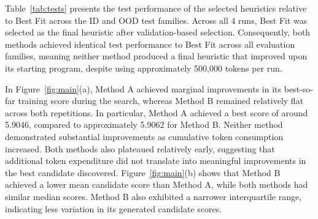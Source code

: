 \documentclass[12pt]{article}
\begin{document}
\begin{table}[htbp]\centering\scriptsize\caption{Test results relative to Best Fit. Comparison columns report differences in total bins used.}\label{tab:tests}
\end{table}





Table~\ref{tab:tests} presents the test performance of the selected heuristics relative to Best Fit across the ID and OOD test families. Across all 4 runs, Best Fit was selected as the final heuristic after validation-based selection. Consequently, both methods achieved identical test performance to Best Fit across all evaluation families, meaning neither method produced a final heuristic that improved upon its starting program, despite using approximately 500,000 tokens per run.


In Figure~\ref{fig:main}(a), Method A achieved marginal improvements in its best-so-far training score during the search, whereas Method B remained relatively flat across both repetitions. In particular, Method A achieved a best score of around 5.9046, compared to approximately 5.9062 for Method B. Neither method demonstrated substantial improvements as cumulative token consumption increased. Both methods also plateaued relatively early, suggesting that additional token expenditure did not translate into meaningful improvements in the best candidate discovered.
Figure~\ref{fig:main}(b) shows that Method B achieved a lower mean candidate score than Method A, while both methods had similar median scores. Method B also exhibited a narrower interquartile range, indicating less variation in its generated candidate scores.
\end{document}
